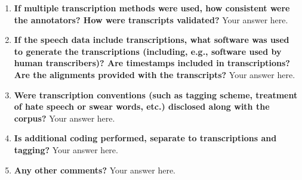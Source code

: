 \documentclass{article}
\begin{document}
\begin{enumerate}[leftmargin=0.65cm]
        \item \textbf{If multiple transcription methods were used, how consistent were the annotators? How were transcripts validated? }
        \newline 
        Your answer here.
        \newline 
        
        \item \textbf{If the speech data include transcriptions, what software was used to generate the transcriptions (including, e.g., software used by human transcribers)? Are timestamps included in transcriptions? Are the alignments provided with the transcripts?}
        \newline 
        Your answer here.
        \newline 
        
        \item \textbf{Were transcription conventions (such as tagging scheme, treatment of hate speech or swear words, etc.) disclosed along with the corpus?}
        \newline 
        Your answer here.
        \newline 
        
        \item \textbf{Is additional coding performed, separate to transcriptions and tagging?}
        \newline 
        Your answer here.
        \newline 
        
        \item \textbf{Any other comments?}
        \newline 
        Your answer here.
        \newline 
    \end{enumerate}
    \\\\
    \noindent{}
\end{document}
